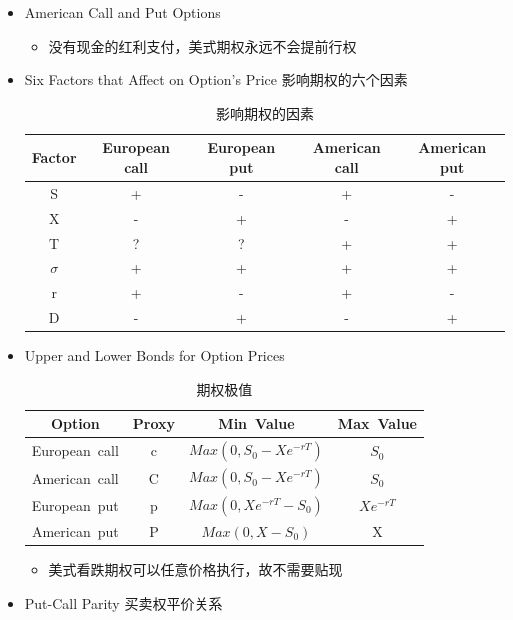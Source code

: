 \documentclass[a4paper,6pt,twoside,openany]{article}
\begin{document}
\begin{itemize}
\item American Call and Put Options
  \begin{itemize}
  \item 没有现金的红利支付，美式期权永远不会提前行权
  \end{itemize}
\item Six Factors that Affect on Option’s Price 影响期权的六个因素
  \begin{table}[!htbp]
    \renewcommand\arraystretch{1.5}
    \caption{影响期权的因素}
    \centering
    \begin{tabular}{|c|c|c|c|c|} \hline
      \rowcolor[gray]{0.5}
Factor & European call & European put & American call & American put \\ \hline
      S & + & - & + & - \\ \hline
      X & - & + & - & + \\ \hline
      T & ? & ? & + & + \\ \hline
      $\sigma$ & + & + & + & + \\ \hline
      r & + & - & + & - \\ \hline
      D & - & + & - & + \\ \hline
    \end{tabular}
  \end{table}
\item Upper and Lower Bonds for Option Prices
\begin{table}[!htbhtbp]
  \renewcommand\arraystretch{1.5}
  \caption{期权极值}
  \centering
  \begin{tabular}{|c|c|c|c|} \hline
    \rowcolor[gray]{0.5}
    Option & Proxy & Min\ Value & Max\ Value  \\ \hline
    European\ call & c & $Max(0, S_0 - Xe^{-rT})$ & $S_0$ \\ \hline
    American\ call & C & $Max(0, S_0 - Xe^{-rT})$ & $S_0$ \\ \hline
    European\ put & p & $Max(0, Xe^{-rT}- S_0)$ & $Xe^{-rT}$ \\ \hline
    American\ put & P & $Max(0, X - S_0)$ & X \\ \hline
  \end{tabular}
\end{table}
\begin{itemize}
  \item 美式看跌期权可以任意价格执行，故不需要贴现
  \end{itemize}
\item Put-Call Parity 买卖权平价关系 
  \begin{itemize}

\end{itemize}
\end{itemize}
\end{document}
